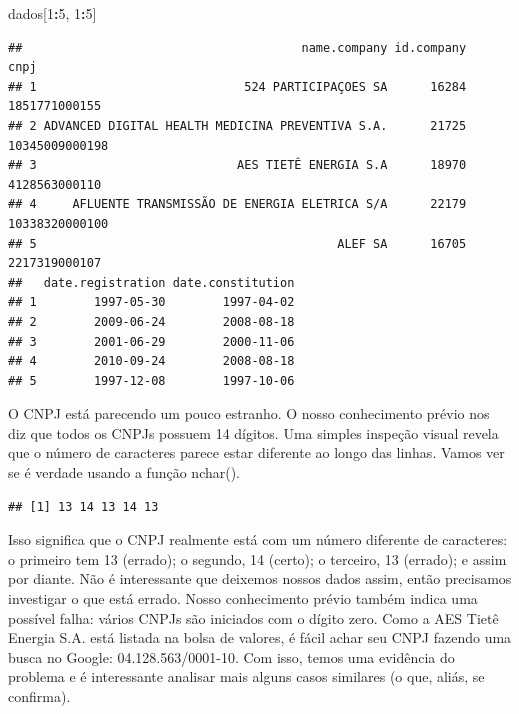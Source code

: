 \documentclass[
]{book}
\newenvironment{Shaded}{\begin{snugshade}}{\end{snugshade}}
\newcommand{\DecValTok}[1]{\textcolor[rgb]{0.00,0.00,0.81}{#1}}
\newcommand{\KeywordTok}[1]{\textcolor[rgb]{0.13,0.29,0.53}{\textbf{#1}}}
\newcommand{\NormalTok}[1]{#1}
\newcommand{\OperatorTok}[1]{\textcolor[rgb]{0.81,0.36,0.00}{\textbf{#1}}}
\begin{document}
\begin{Shaded}
\begin{Highlighting}[]
\NormalTok{dados[}\DecValTok{1}\OperatorTok{:}\DecValTok{5}\NormalTok{, }\DecValTok{1}\OperatorTok{:}\DecValTok{5}\NormalTok{]}
\end{Highlighting}
\end{Shaded}

\begin{verbatim}
##                                       name.company id.company           cnpj
## 1                             524 PARTICIPAÇOES SA      16284  1851771000155
## 2 ADVANCED DIGITAL HEALTH MEDICINA PREVENTIVA S.A.      21725 10345009000198
## 3                            AES TIETÊ ENERGIA S.A      18970  4128563000110
## 4     AFLUENTE TRANSMISSÃO DE ENERGIA ELETRICA S/A      22179 10338320000100
## 5                                          ALEF SA      16705  2217319000107
##   date.registration date.constitution
## 1        1997-05-30        1997-04-02
## 2        2009-06-24        2008-08-18
## 3        2001-06-29        2000-11-06
## 4        2010-09-24        2008-08-18
## 5        1997-12-08        1997-10-06
\end{verbatim}

O CNPJ está parecendo um pouco estranho. O nosso conhecimento prévio nos diz que todos os CNPJs possuem 14 dígitos. Uma simples inspeção visual revela que o número de caracteres parece estar diferente ao longo das linhas. Vamos ver se é verdade usando a função nchar().

\begin{Shaded}
\end{Shaded}

\begin{verbatim}
## [1] 13 14 13 14 13
\end{verbatim}

Isso significa que o CNPJ realmente está com um número diferente de caracteres: o primeiro tem 13 (errado); o segundo, 14 (certo); o terceiro, 13 (errado); e assim por diante. Não é interessante que deixemos nossos dados assim, então precisamos investigar o que está errado. Nosso conhecimento prévio também indica uma possível falha: vários CNPJs são iniciados com o dígito zero. Como a AES Tietê Energia S.A. está listada na bolsa de valores, é fácil achar seu CNPJ fazendo uma busca no Google: 04.128.563/0001-10. Com isso, temos uma evidência do problema e é interessante analisar mais alguns casos similares (o que, aliás, se confirma).
\end{document}
